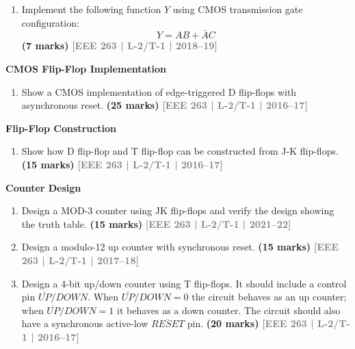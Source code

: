 \documentclass[12pt,a3paper]{article}
\newcommand{\yr}[1]{\hfill\textcolor{gray}{\small\textbf{[#1]}}}
\newcommand{\mk}[1]{\textcolor{orange!70!black}{\small\textbf{(#1 marks)}}}
\newcommand{\subtopic}[2]{%
  \vspace{10pt}
  \noindent\begin{tcolorbox}[colback=#1!8,colframe=#1,boxrule=0.6pt,arc=4pt,
    left=6pt,right=6pt,top=4pt,bottom=4pt]
    \small\bfseries\textcolor{#1}{#2}
  \end{tcolorbox}
  \vspace{2pt}
}
\begin{document}
\begin{enumerate}\item Implement the following function $Y$ using CMOS transmission gate configuration:
\[
Y = AB + \bar{A}C
\]
\mk{7} \yr{EEE 263 | L-2/T-1 | 2018--19}

\end{enumerate}

\subtopic{cD}{CMOS Flip-Flop Implementation}
\label{sub:s9-ff-cmos}

\begin{enumerate}\item Show a CMOS implementation of edge-triggered D flip-flops with asynchronous reset.
\mk{25} \yr{EEE 263 | L-2/T-1 | 2016--17}

\end{enumerate}

\subtopic{cD}{Flip-Flop Construction}
\label{sub:s9-ff-construction}

\begin{enumerate}\item Show how D flip-flop and T flip-flop can be constructed from J-K flip-flops.
\mk{15} \yr{EEE 263 | L-2/T-1 | 2016--17}

\end{enumerate}

\subtopic{cD}{Counter Design}
\label{sub:s9-counter}

\begin{enumerate}\item Design a MOD-3 counter using JK flip-flops and verify the design showing the truth table.
\mk{15} \yr{EEE 263 | L-2/T-1 | 2021--22}

\item Design a modulo-12 up counter with synchronous reset.
\mk{15} \yr{EEE 263 | L-2/T-1 | 2017--18}

\item Design a 4-bit up/down counter using T flip-flops. It should include a control pin $\overline{UP}/DOWN$. When $\overline{UP}/DOWN=0$ the circuit behaves as an up counter; when $\overline{UP}/DOWN=1$ it behaves as a down counter. The circuit should also have a synchronous active-low $\overline{RESET}$ pin.
\mk{20} \yr{EEE 263 | L-2/T-1 | 2016--17}

\end{enumerate}
\end{document}
